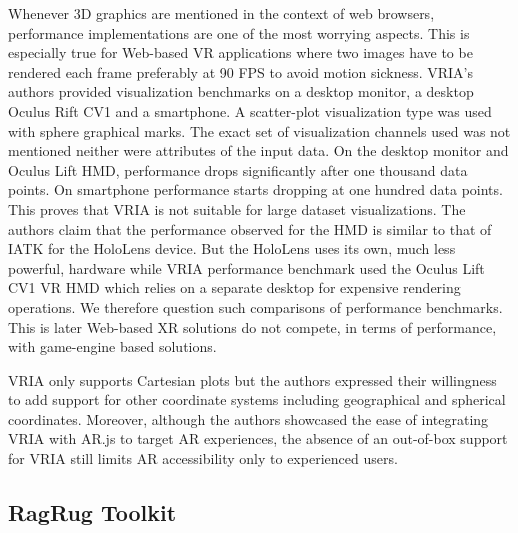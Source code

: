 \documentclass{vgtc}                          %
\begin{document}
\noindent Whenever 3D graphics are mentioned in the context of web browsers,
performance implementations are one of the most worrying aspects. This is
especially true for Web-based VR applications where two images have to be
rendered each frame preferably at 90 FPS to avoid motion sickness. VRIA's
authors provided visualization benchmarks on a desktop monitor, a desktop
Oculus Rift CV1 and a smartphone. A scatter-plot visualization type was used
with sphere graphical marks. The exact set of visualization channels used
was not mentioned neither were attributes of the input data. On the desktop
monitor and Oculus Lift HMD, performance drops significantly after one
thousand data points. On smartphone performance starts dropping at one hundred
data points. This proves that VRIA is not suitable for large dataset
visualizations. The authors claim that the performance observed for the HMD
is similar to that of IATK for the HoloLens device. But the HoloLens uses
its own, much less powerful, hardware while VRIA performance benchmark used
the Oculus Lift CV1 VR HMD which relies on a separate desktop for expensive
rendering operations. We therefore question such comparisons of performance
benchmarks. This is later Web-based XR solutions do not compete,
in terms of performance, with game-engine based solutions.

\smallskip

\noindent VRIA only supports Cartesian plots but the authors expressed their
willingness to add support for other coordinate systems including geographical
and spherical coordinates.
Moreover, although the authors showcased the ease of integrating VRIA with
AR.js to target AR experiences, the absence of an out-of-box support for VRIA
still limits AR accessibility only to experienced users.

\subsection{RagRug Toolkit}
\end{document}
